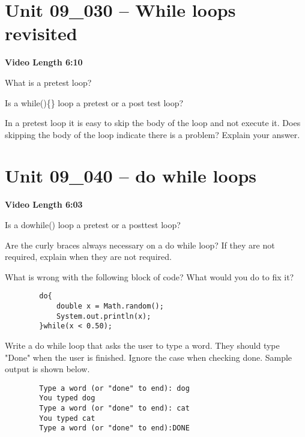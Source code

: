 \documentclass[letterpaper,12pt]{exam}
\newcommand{\unit}{Unit 09}
\begin{document}
\begin{questions}
\section*{\unit\_030 -- While loops revisited} 
\par{\selectfont\textbf{Video Length 6:10}}
\begin{samepage}
    \question What is a pretest loop?
    \vspace{5mm}
\end{samepage}

\begin{samepage}
    \question Is a while()\{\} loop a pretest or a post test loop?
    \vspace{5mm}
\end{samepage}
\begin{samepage}
    \question In a pretest loop it is easy to skip the body of the loop and not execute it.  Does skipping the body of the loop indicate there is a problem?  Explain your answer.
    \vspace{5mm}
\end{samepage}


\section*{\unit\_040 -- do while loops} 
\par{\selectfont\textbf{Video Length 6:03}}
\begin{samepage}
    \question Is a do{}while() loop a pretest or a posttest loop?
    \vspace{5mm}
\end{samepage}

\begin{samepage}
    \question Are the curly braces always necessary on a do while loop?  If they are not required, explain when they are not required.
    \vspace{5mm}
\end{samepage}


\begin{samepage}
    \question What is wrong with the following block of code?  What would you do to fix it?
    \begin{verbatim}
        do{
            double x = Math.random();
            System.out.println(x);
        }while(x < 0.50);
    \end{verbatim}
    \vspace{5mm}
\end{samepage}
\begin{samepage}
    \question Write a do while loop that asks the user to type a word.  They should type "Done" when the user is finished.  Ignore the case when checking done.  Sample output is shown below.
    \begin{verbatim}
        Type a word (or "done" to end): dog 
        You typed dog
        Type a word (or "done" to end): cat 
        You typed cat
        Type a word (or "done" to end):DONE 
    \end{verbatim}     
       \vspace{15mm}
\end{samepage}


\end{questions}
\end{document}
